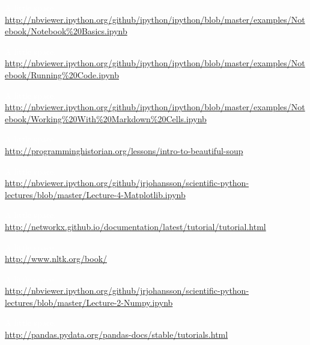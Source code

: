 \begin{description}
\normalsize
\item[IPython Notebook - Basics] \textcolor{white}{A little space.} \\
\small
\url{http://nbviewer.ipython.org/github/ipython/ipython/blob/master/examples/Notebook/Notebook\%20Basics.ipynb}

\normalsize
\item[IPython Notebook - Running code] \textcolor{white}{A little space.} \\
\small
\url{http://nbviewer.ipython.org/github/ipython/ipython/blob/master/examples/Notebook/Running\%20Code.ipynb}

\normalsize
\item[IPython Notebook - Markdown cells] \textcolor{white}{A little space.} \\
\small
\url{http://nbviewer.ipython.org/github/ipython/ipython/blob/master/examples/Notebook/Working\%20With\%20Markdown\%20Cells.ipynb}

\normalsize
\item[beautifulsoup] \textcolor{white}{A little space.} \\
\small
\url{http://programminghistorian.org/lessons/intro-to-beautiful-soup}

\normalsize
\item[matplotlib] \textcolor{white}{A little space.} \\
\small
\url{http://nbviewer.ipython.org/github/jrjohansson/scientific-python-lectures/blob/master/Lecture-4-Matplotlib.ipynb}

\normalsize
\item[networkx] \textcolor{white}{A little space.} \\
\small
\url{http://networkx.github.io/documentation/latest/tutorial/tutorial.html}

\normalsize
\item[nltk] \textcolor{white}{A little space.} \\
\small
\url{http://www.nltk.org/book/}

\normalsize
\item[numpy] \textcolor{white}{A little space.} \\
\small
\url{http://nbviewer.ipython.org/github/jrjohansson/scientific-python-lectures/blob/master/Lecture-2-Numpy.ipynb}

\normalsize
\item[pandas] \textcolor{white}{A little space.} \\
\small
\url{http://pandas.pydata.org/pandas-docs/stable/tutorials.html}


\end{description}

